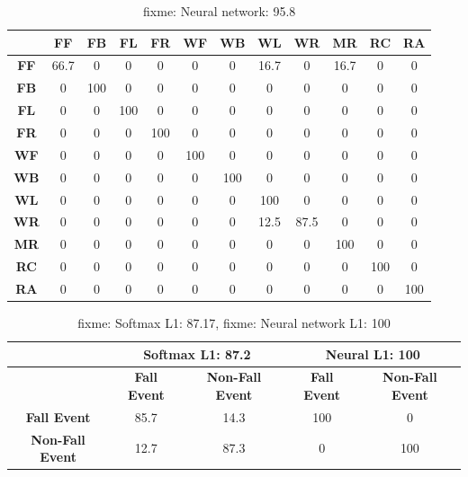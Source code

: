 \documentclass{IEEEtran}
\begin{document}
\begin{table}
\caption{fixme: Neural network: 95.8}
\resizebox{\columnwidth}{!}
{
\begin{tabular}{|c|c|c|c|c|c|c|c|c|c|c|c|}
\hline 
& \textbf{FF} & \textbf{FB}  & \textbf{FL} & \textbf{FR} &  \textbf{WF} & 
\textbf{WB} & \textbf{WL} & \textbf{WR} & \textbf{MR} & 
\textbf{RC} & \textbf{RA} \\ \hline
\textbf{FF} & 66.7 &  0 &  0 &  0 &  0 &  0 &  16.7 &  0 &  16.7 &  0 &  0 \\ \hline
\textbf{FB} & 0 &  100 &  0 &  0 &  0 &  0 &  0 &  0 &  0 &  0 &  0 \\ \hline
\textbf{FL} & 0 &  0 &  100 &  0 &  0 &  0 &  0 &  0 &  0 &  0 &  0 \\ \hline
\textbf{FR} & 0 &  0 &  0 &  100 &  0 &  0 &  0 &  0 &  0 &  0 &  0 \\ \hline
\textbf{WF} & 0 &  0 &  0 &  0 &  100 &  0 &  0 &  0 &  0 &  0 &  0 \\ \hline
\textbf{WB} & 0 &  0 &  0 &  0 &  0 &  100 &  0 &  0 &  0 &  0 &  0 \\ \hline
\textbf{WL} & 0 &  0 &  0 &  0 &  0 &  0 &  100 &  0 &  0 &  0 &  0 \\ \hline
\textbf{WR} & 0 &  0 &  0 &  0 &  0 &  0 &  12.5 &  87.5 &  0 &  0 &  0 \\ \hline
\textbf{MR} & 0 &  0 &  0 &  0 &  0 &  0 &  0 &  0 &  100 &  0 &  0 \\ \hline
\textbf{RC} & 0 &  0 &  0 &  0 &  0 &  0 &  0 &  0 &  0 &  100 &  0 \\ \hline
\textbf{RA} & 0 &  0 &  0 &  0 &  0 &  0 &  0 &  0 &  0 &  0 &  100 \\ \hline
\end{tabular}
}
\end{table}

\begin{table}
\caption{fixme: Softmax L1: 87.17, fixme: Neural network L1: 100}
\resizebox{\columnwidth}{!}
{
\begin{tabular}{|c|c|c||c|c|}
\hline
& \multicolumn{2}{c||}{\bf Softmax L1: 87.2} & \multicolumn{2}{c|}{\bf Neural L1: 
100} \\ \hline
& \textbf{Fall Event} & \textbf{Non-Fall Event}  & \textbf{Fall Event} & \textbf{Non-Fall 
Event} \\ \hline
\textbf{Fall Event} & 85.7 &  14.3  & 100 &  0 \\ \hline
\textbf{Non-Fall Event} & 12.7 &  87.3 & 0 &  100 \\ \hline
\end{tabular}
}
\end{table}
\end{document}
